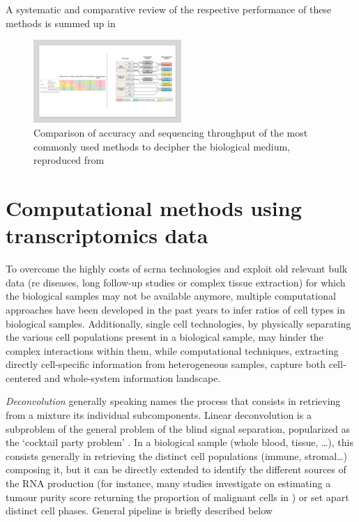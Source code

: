 A systematic and comparative review of the respective performance of these methods is summed up in 

\begin{figure}
    \centering
    \includegraphics[width=0.5\textwidth]{figures/tme_estimation_technics.PNG}
    \caption{Comparison of accuracy and sequencing throughput of the most commonly used methods to decipher the biological medium, reproduced from \autocite{finotello_trajanoski18}}
    \label{fig:mse-complex_heatmap}
\end{figure}



\section{Computational methods using transcriptomics data}
\label{computational-methods-using-transcriptomics-data}

To overcome the highly costs of  \acrshort{scrna} technologies and exploit old
relevant bulk data (re diseases, long follow-up studies or complex
tissue extraction) for which the biological samples may not be available
anymore, multiple computational approaches have been developed in the
past years to infer ratios of cell types in biological
samples\autocite{avilacobos_etal18}. Additionally, single cell technologies, by physically separating
the various cell populations present in a biological sample, may hinder
the complex interactions within them, while computational techniques,
extracting directly cell-specific information from heterogeneous
samples, capture both cell-centered and whole-system information
landscape.

\emph{Deconvolution} generally speaking names the process that consists
in retrieving from a mixture its individual subcomponents. Linear
deconvolution is a subproblem of the general problem of the blind signal
separation, popularized as the `cocktail party problem'
\autocite{cherry53}. In a biological sample
(whole blood, tissue, \ldots), this consists generally in retrieving the
distinct cell populations (immune, stromal\ldots) composing it, but it
can be directly extended to identify the different sources of the RNA
production (for instance, many studies investigate on estimating a
tumour purity score returning the proportion of malignant cells in \autocite{yoshihara_etal13})
or set apart distinct cell phases. General pipeline is briefly described below 

